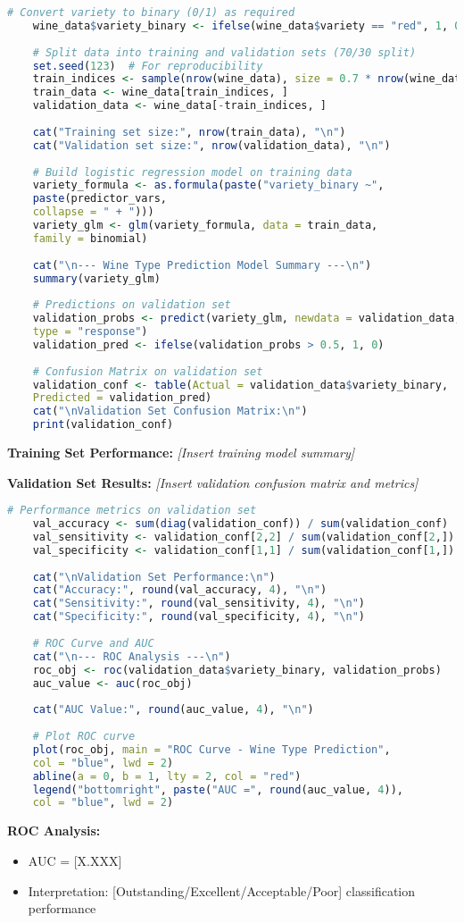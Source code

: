 \begin{lstlisting}[language=R, caption=Wine Type Prediction with Validation, breaklines=true]
	# Convert variety to binary (0/1) as required
	wine_data$variety_binary <- ifelse(wine_data$variety == "red", 1, 0)
	
	# Split data into training and validation sets (70/30 split)
	set.seed(123)  # For reproducibility
	train_indices <- sample(nrow(wine_data), size = 0.7 * nrow(wine_data))
	train_data <- wine_data[train_indices, ]
	validation_data <- wine_data[-train_indices, ]
	
	cat("Training set size:", nrow(train_data), "\n")
	cat("Validation set size:", nrow(validation_data), "\n")
	
	# Build logistic regression model on training data
	variety_formula <- as.formula(paste("variety_binary ~", 
	paste(predictor_vars, 
	collapse = " + ")))
	variety_glm <- glm(variety_formula, data = train_data, 
	family = binomial)
	
	cat("\n--- Wine Type Prediction Model Summary ---\n")
	summary(variety_glm)
	
	# Predictions on validation set
	validation_probs <- predict(variety_glm, newdata = validation_data, 
	type = "response")
	validation_pred <- ifelse(validation_probs > 0.5, 1, 0)
	
	# Confusion Matrix on validation set
	validation_conf <- table(Actual = validation_data$variety_binary, 
	Predicted = validation_pred)
	cat("\nValidation Set Confusion Matrix:\n")
	print(validation_conf)
\end{lstlisting}

\textbf{Training Set Performance:}
\textit{[Insert training model summary]}

\textbf{Validation Set Results:}
\textit{[Insert validation confusion matrix and metrics]}

\begin{lstlisting}[language=R, caption=ROC Analysis, breaklines=true]
	# Performance metrics on validation set
	val_accuracy <- sum(diag(validation_conf)) / sum(validation_conf)
	val_sensitivity <- validation_conf[2,2] / sum(validation_conf[2,])
	val_specificity <- validation_conf[1,1] / sum(validation_conf[1,])
	
	cat("\nValidation Set Performance:\n")
	cat("Accuracy:", round(val_accuracy, 4), "\n")
	cat("Sensitivity:", round(val_sensitivity, 4), "\n")
	cat("Specificity:", round(val_specificity, 4), "\n")
	
	# ROC Curve and AUC
	cat("\n--- ROC Analysis ---\n")
	roc_obj <- roc(validation_data$variety_binary, validation_probs)
	auc_value <- auc(roc_obj)
	
	cat("AUC Value:", round(auc_value, 4), "\n")
	
	# Plot ROC curve
	plot(roc_obj, main = "ROC Curve - Wine Type Prediction",
	col = "blue", lwd = 2)
	abline(a = 0, b = 1, lty = 2, col = "red")
	legend("bottomright", paste("AUC =", round(auc_value, 4)), 
	col = "blue", lwd = 2)
\end{lstlisting}

\textbf{ROC Analysis:}
\begin{itemize}
	\item AUC = [X.XXX]
	\item Interpretation: [Outstanding/Excellent/Acceptable/Poor] classification performance
\end{itemize}